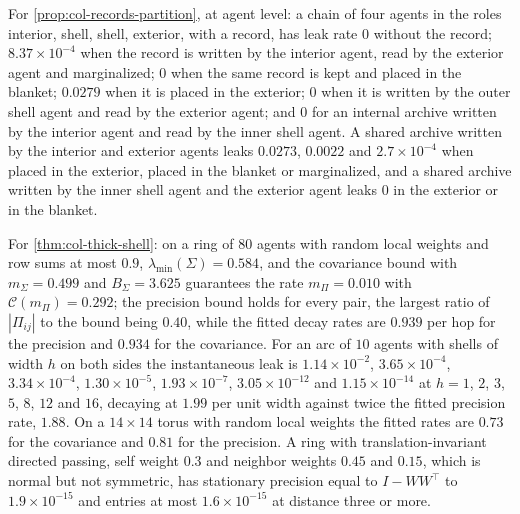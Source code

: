 
\begin{numcheck}\label{chk:col-records}
For \cref{prop:col-records-partition}, at agent level: a chain of four agents in the roles interior, shell, shell, exterior, with a record, has leak rate $0$ without the record; $8.37\times10^{-4}$ when the record is written by the interior agent, read by the exterior agent and marginalized; $0$ when the same record is kept and placed in the blanket; $0.0279$ when it is placed in the exterior; $0$ when it is written by the outer shell agent and read by the exterior agent; and $0$ for an internal archive written by the interior agent and read by the inner shell agent. A shared archive written by the interior and exterior agents leaks $0.0273$, $0.0022$ and $2.7\times10^{-4}$ when placed in the exterior, placed in the blanket or marginalized, and a shared archive written by the inner shell agent and the exterior agent leaks $0$ in the exterior or in the blanket.
\end{numcheck}

\begin{numcheck}\label{chk:col-shell}
For \cref{thm:col-thick-shell}: on a ring of $80$ agents with random local weights and row sums at most $0.9$, $\lambda_{\min}(\Sigma)=0.584$, and the covariance bound with $m_\Sigma=0.499$ and $B_\Sigma=3.625$ guarantees the rate $m_\Pi=0.010$ with $\mathcal C(m_\Pi)=0.292$; the precision bound holds for every pair, the largest ratio of $|\Pi_{ij}|$ to the bound being $0.40$, while the fitted decay rates are $0.939$ per hop for the precision and $0.934$ for the covariance. For an arc of $10$ agents with shells of width $h$ on both sides the instantaneous leak is $1.14\times10^{-2}$, $3.65\times10^{-4}$, $3.34\times10^{-4}$, $1.30\times10^{-5}$, $1.93\times10^{-7}$, $3.05\times10^{-12}$ and $1.15\times10^{-14}$ at $h=1$, $2$, $3$, $5$, $8$, $12$ and $16$, decaying at $1.99$ per unit width against twice the fitted precision rate, $1.88$. On a $14\times14$ torus with random local weights the fitted rates are $0.73$ for the covariance and $0.81$ for the precision. A ring with translation-invariant directed passing, self weight $0.3$ and neighbor weights $0.45$ and $0.15$, which is normal but not symmetric, has stationary precision equal to $I-WW^\top$ to $1.9\times10^{-15}$ and entries at most $1.6\times10^{-15}$ at distance three or more.
\end{numcheck}

